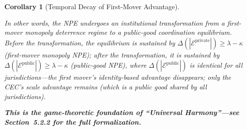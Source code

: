 \documentclass[12pt,a4paper]{article}
\newtheorem{corollary}[theorem]{Corollary}
\theoremstyle{definition}
\theoremstyle{remark}
\begin{document}
\begin{corollary}[Temporal Decay of First-Mover Advantage]
\begin{enumerate}[label=(\roman*), itemsep=6pt]
In other words, the NPE undergoes an institutional transformation from a \textit{first-mover monopoly deterrence} regime to a \textit{public-good coordination equilibrium}. Before the transformation, the equilibrium is sustained by $\Delta(|\mathcal{E}^{\text{private}}|) \geq \lambda - \kappa$ (first-mover monopoly NPE); after the transformation, it is sustained by $\Delta(|\mathcal{E}^{\text{public}}|) \geq \lambda - \kappa$ (public-good NPE), where $\Delta(|\mathcal{E}^{\text{public}}|)$ is identical for all jurisdictions—the first mover's identity-based advantage disappears; only the CEC's scale advantage remains (which is a public good shared by all jurisdictions).

\textbf{This is the game-theoretic foundation of ``Universal Harmony''—see Section~5.2.2 for the full formalization.}
\end{enumerate}
\end{corollary}
\end{document}
